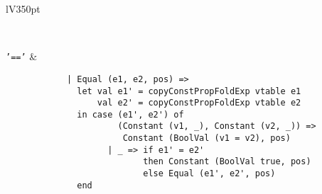 \documentclass[a4paper]{article}
\newcommand{\command}[1]{\texttt{\string#1}}
\begin{document}
\begin{center}
\begin{tabular}{lV{350pt}}
\begin{verbatim}
		\end{verbatim}
		\\
		\command{'=='} &
		\begin{verbatim}
			| Equal (e1, e2, pos) =>
			  let val e1' = copyConstPropFoldExp vtable e1
			      val e2' = copyConstPropFoldExp vtable e2
			  in case (e1', e2') of
			          (Constant (v1, _), Constant (v2, _)) =>
			           Constant (BoolVal (v1 = v2), pos)
			        | _ => if e1' = e2'
			               then Constant (BoolVal true, pos)
			               else Equal (e1', e2', pos)
			  end
		\end{verbatim}
		\\ 
		\bottomrule \\
	\end{tabular}
\end{center}

\newpage
\end{document}
